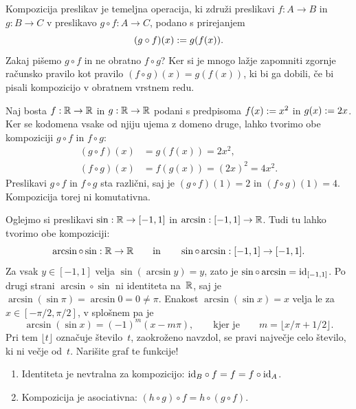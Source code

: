 Kompozicija preslikav je temeljna operacija, ki združi preslikavi $f : A \to B$ in $g : B \to C$ v preslikavo
$g \circ f : A \to C$, podano s prirejanjem
%
\begin{equation*}
  (g \circ f)(x) \defeq g (f (x)).
\end{equation*}
%
Zakaj pišemo $g \circ f$ in ne obratno $f \circ g$?  Ker si je mnogo lažje zapomniti zgornje računsko pravilo kot pravilo $(f \circ g)(x) = g(f(x))$, ki bi ga dobili, če bi pisali kompozicijo v obratnem vrstnem redu.

\begin{zgled}
  Naj bosta $f : \RR \to \RR$ in $g : \RR \to \RR$ podani s predpisoma $f(x) \defeq x^2$ in $g(x) \defeq 2 x$.
  Ker se kodomena vsake od njiju ujema z domeno druge, lahko tvorimo obe kompoziciji $g \circ f$ in $f \circ g$:
  \begin{align*}
    (g \circ f)(x) &= g(f(x)) = 2 x^2, \\
    (f \circ g)(x) &= f(g(x)) = (2 x)^2 = 4 x^2.
  \end{align*}
  Preslikavi $g \circ f$ in $f \circ g$ sta različni, saj je $(g \circ f)(1) = 2$ in $(f \circ g)(1) = 4$.
  Kompozicija torej ni komutativna.
\end{zgled}

\begin{zgled}
  Oglejmo si preslikavi $\sin : \RR \to [-1, 1]$ in $\arcsin : [-1, 1] \to \RR$.
  Tudi tu lahko tvorimo obe kompoziciji:
  \begin{equation*}
    \arcsin \circ \sin : \RR \to \RR
    \qquad\text{in}\qquad
    \sin \circ \arcsin : [-1, 1] \to [-1, 1].
  \end{equation*}
  Za vsak $y \in [-1, 1]$ velja $\sin(\arcsin y) = y$, zato je $\sin \circ \arcsin = \id[{[-1, 1]}]$.
  Po drugi strani $\arcsin \circ \sin$ ni identiteta na~$\RR$, saj je $\arcsin(\sin \pi) = \arcsin 0 = 0 \neq \pi$.
  Enakost $\arcsin(\sin x) = x$ velja le za $x \in [-\pi/2, \pi/2]$, v splošnem pa je
  \begin{equation*}
    \arcsin(\sin x) = (-1)^m (x - m \pi),
    \qquad\text{kjer je}\qquad
    m = \lfloor x/\pi + 1/2 \rfloor.
  \end{equation*}
  Pri tem $\lfloor t \rfloor$ označuje število~$t$, zaokroženo navzdol, se pravi največje celo število, ki ni večje od~$t$.
  Narišite graf te funkcije!
\end{zgled}

\begin{trditev}
  \parbox{0pt}{}
  \begin{enumerate}
  \item Identiteta je nevtralna za kompozicijo: $\id[B] \circ f = f = f \circ \id[A]$.
  \item Kompozicija je asociativna: $(h \circ g) \circ f = h \circ (g \circ f)$.
  \end{enumerate}
\end{trditev}

